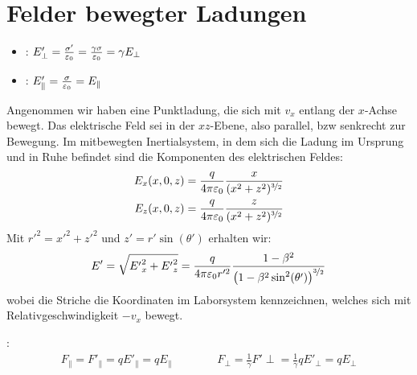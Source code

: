 \section{Felder bewegter Ladungen}

\vspace{1\baselineskip}

\begin{itemize}
    \item {}: $E'_{\perp} = \frac{\sigma'}{\varepsilon_0} =
            \frac{\gamma \sigma}{\varepsilon_0} = \gamma E_{\perp}$
    \item {}: $E'_{\parallel} = \frac{\sigma}{\varepsilon_0}
            = E_{\parallel}$
\end{itemize}

\pagebreak


Angenommen wir haben eine Punktladung, die sich mit $v_x$ entlang der $x$-Achse bewegt.
Das elektrische Feld sei in der $xz$-Ebene, also parallel, bzw senkrecht zur Bewegung.
Im mitbewegten Inertialsystem, in dem sich die Ladung im Ursprung und in Ruhe befindet
sind die Komponenten des elektrischen Feldes:
\begin{align*}
    E_x (x,0,z) = \frac{q}{4 \pi \varepsilon_0} \frac{x}{(x^2 + z^2)^{\nicefrac{3}{2}}}
    \\
    E_z (x,0,z) = \frac{q}{4 \pi \varepsilon_0} \frac{z}{(x^2 + z^2)^{\nicefrac{3}{2}}}
\end{align*}
Mit $r'^2 = x'^2 + z'^2$ und $z' = r' \sin(\theta')$ erhalten wir:
\begin{align*}
    E' = \sqrt{{E'}_x^2 + {E'}_z^2} = \frac{q}{4 \pi \varepsilon_0 r'^2} \frac{1-\beta^2}{\left( 1-\beta^2 \sin^2(\theta') \right)^{\nicefrac{3}{2}}}
\end{align*}
wobei die Striche die Koordinaten im Laborsystem kennzeichnen, welches sich mit
Relativgeschwindigkeit $-v_x$ bewegt.

\vspace{1\baselineskip}

:
\begin{align*}
    F_{\parallel} = F'_{\parallel} = q E'_{\parallel} = q E_{\parallel}
    \quad \quad \quad \quad
    F_{\perp} = \frac{1}{\gamma} F'{\perp} = \frac{1}{\gamma} q E'_{\perp} = q E_{\perp}
\end{align*}
